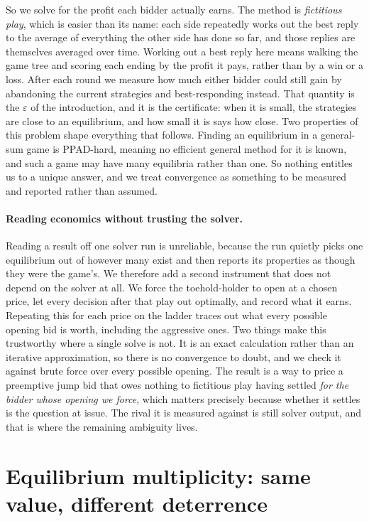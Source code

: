 \documentclass[11pt,a4paper]{article}
\begin{document}
So we solve for the profit each bidder actually earns. The method is \emph{fictitious play}, which is easier than its name: each side repeatedly works out the best reply to the average of everything the other side has done so far, and those replies are themselves averaged over time. Working out a best reply here means walking the game tree and scoring each ending by the profit it pays, rather than by a win or a loss. After each round we measure how much either bidder could still gain by abandoning the current strategies and best-responding instead. That quantity is the $\varepsilon$ of the introduction, and it is the certificate: when it is small, the strategies are close to an equilibrium, and how small it is says how close. Two properties of this problem shape everything that follows. Finding an equilibrium in a general-sum game is PPAD-hard, meaning no efficient general method for it is known, and such a game may have many equilibria rather than one. So nothing entitles us to a unique answer, and we treat convergence as something to be measured and reported rather than assumed.

\paragraph{Reading economics without trusting the solver.} Reading a result off one solver run is unreliable, because the run quietly picks one equilibrium out of however many exist and then reports its properties as though they were the game's. We therefore add a second instrument that does not depend on the solver at all. We force the toehold-holder to open at a chosen price, let every decision after that play out optimally, and record what it earns. Repeating this for each price on the ladder traces out what every possible opening bid is worth, including the aggressive ones. Two things make this trustworthy where a single solve is not. It is an exact calculation rather than an iterative approximation, so there is no convergence to doubt, and we check it against brute force over every possible opening. The result is a way to price a preemptive jump bid that owes nothing to fictitious play having settled \emph{for the bidder whose opening we force}, which matters precisely because whether it settles is the question at issue. The rival it is measured against is still solver output, and that is where the remaining ambiguity lives.

\section{Equilibrium multiplicity: same value, different deterrence}
\label{sec:multiplicity}
\end{document}
